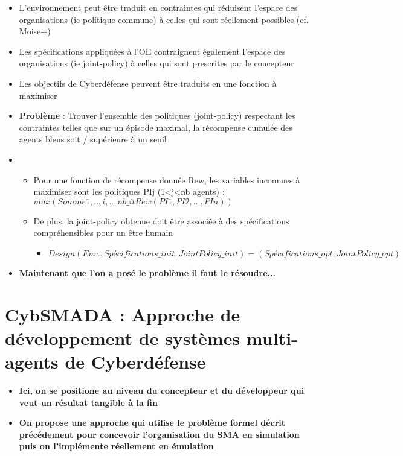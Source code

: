 \begin{itemize}
    \item L'environnement peut être traduit en contraintes qui réduisent l'espace des organisations (ie politique commune) à celles qui sont réellement possibles (cf. Moise+)
    \item Les spécifications appliquées à l'OE contraignent également l'espace des organisations (ie joint-policy) à celles qui sont prescrites par le concepteur
    \item Les objectifs de Cyberdéfense peuvent être traduits en une fonction à maximiser
    \item \textbf{Problème} : Trouver l'ensemble des politiques (joint-policy) respectant les contraintes telles que sur un épisode maximal, la récompense cumulée des agents bleus soit / supérieure à un seuil
    \item \begin{itemize}
              \item Pour une fonction de récompense donnée Rew, les variables inconnues à maximiser sont les politiques PIj (1<j<nb agents) :
                    $max (Somme{1, .., i, .., nb\_it} Rew(PI1, PI2, …, PIn))$
              \item De plus, la joint-policy obtenue doit être associée à des spécifications compréhensibles pour un être humain
                    \begin{itemize}
                        \item $Design(Env., Spécifications\_init, JointPolicy\_init) = (Spécifications\_opt, JointPolicy\_opt)$
                    \end{itemize}
          \end{itemize}
    \item \textbf{Maintenant que l'on a posé le problème il faut le résoudre...}
\end{itemize}

\section{CybSMADA : Approche de développement de systèmes multi-agents de Cyberdéfense}\label{sec:cybSMAda}

\begin{itemize}
    \item \textbf{Ici, on se positione au niveau du concepteur et du développeur qui veut un résultat tangible à la fin}
    \item \textbf{On propose une approche qui utilise le problème formel décrit précédement pour concevoir l'organisation du SMA en simulation puis on l'implémente réellement en émulation}
\end{itemize}

